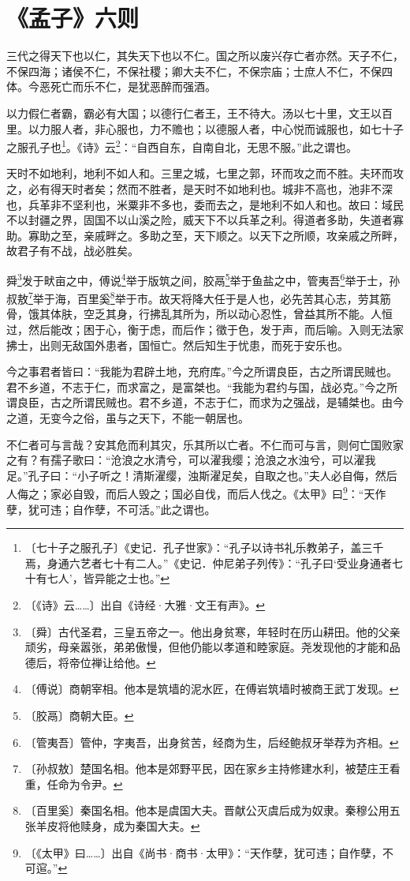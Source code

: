 \documentclass[12pt,UTF-8,openany]{ctexbook}
\begin{document}
\chapter{《孟子》六则}

\begin{normalsize}
    
    三代之得天下也以仁，其失天下也以不仁。国之所以废兴存亡者亦然。天子不仁，不保四海；诸侯不仁，不保社稷；卿大夫不仁，不保宗庙；士庶人不仁，不保四体。今恶死亡而乐不仁，是犹恶醉而强酒。
    
    以力假仁者霸，霸必有大国；以德行仁者王，王不待大。汤以七十里，文王以百里。以力服人者，非心服也，力不赡也；以德服人者，中心悦而诚服也，如七十子之服孔子也\footnote{〔七十子之服孔子〕《史记．孔子世家》：“孔子以诗书礼乐教弟子，盖三千焉，身通六艺者七十有二人。”《史记．仲尼弟子列传》：“孔子曰‘受业身通者七十有七人’，皆异能之士也。”}。《诗》云\footnote{〔《诗》云……〕出自《诗经·大雅·文王有声》。}：“自西自东，自南自北，无思不服。”此之谓也。
    
    天时不如地利，地利不如人和。三里之城，七里之郭，环而攻之而不胜。夫环而攻之，必有得天时者矣；然而不胜者，是天时不如地利也。城非不高也，池非不深也，兵革非不坚利也，米粟非不多也，委而去之，是地利不如人和也。故曰：域民不以封疆之界，固国不以山溪之险，威天下不以兵革之利。得道者多助，失道者寡助。寡助之至，亲戚畔之。多助之至，天下顺之。以天下之所顺，攻亲戚之所畔，故君子有不战，战必胜矣。
    
    舜\footnote{〔舜〕古代圣君，三皇五帝之一。他出身贫寒，年轻时在历山耕田。他的父亲顽劣，母亲嚣张，弟弟傲慢，但他仍能以孝道和睦家庭。尧发现他的才能和品德后，将帝位禅让给他。}发于畎亩之中，傅说\footnote{〔傅说〕商朝宰相。他本是筑墙的泥水匠，在傅岩筑墙时被商王武丁发现。}举于版筑之间，胶鬲\footnote{〔胶鬲〕商朝大臣。}举于鱼盐之中，管夷吾\footnote{〔管夷吾〕管仲，字夷吾，出身贫苦，经商为生，后经鲍叔牙举荐为齐相。}举于士，孙叔敖\footnote{〔孙叔敖〕楚国名相。他本是郊野平民，因在家乡主持修建水利，被楚庄王看重，任命为令尹。}举于海，百里奚\footnote{〔百里奚〕秦国名相。他本是虞国大夫。晋献公灭虞后成为奴隶。秦穆公用五张羊皮将他赎身，成为秦国大夫。}举于市。故天将降大任于是人也，必先苦其心志，劳其筋骨，饿其体肤，空乏其身，行拂乱其所为，所以动心忍性，曾益其所不能。人恒过，然后能改；困于心，衡于虑，而后作；徵于色，发于声，而后喻。入则无法家拂士，出则无敌国外患者，国恒亡。然后知生于忧患，而死于安乐也。
    
    今之事君者皆曰：“我能为君辟土地，充府库。”今之所谓良臣，古之所谓民贼也。君不乡道，不志于仁，而求富之，是富桀也。“我能为君约与国，战必克。”今之所谓良臣，古之所谓民贼也。君不乡道，不志于仁，而求为之强战，是辅桀也。由今之道，无变今之俗，虽与之天下，不能一朝居也。
    
    不仁者可与言哉？安其危而利其灾，乐其所以亡者。不仁而可与言，则何亡国败家之有？有孺子歌曰：“沧浪之水清兮，可以濯我缨；沧浪之水浊兮，可以濯我足。”孔子曰：“小子听之！清斯濯缨，浊斯濯足矣，自取之也。”夫人必自侮，然后人侮之；家必自毁，而后人毁之；国必自伐，而后人伐之。《太甲》曰\footnote{〔《太甲》曰……〕出自《尚书·商书·太甲》：“天作孽，犹可违；自作孽，不可逭。”}：“天作孽，犹可违；自作孽，不可活。”此之谓也。
\end{normalsize}
\end{document}
